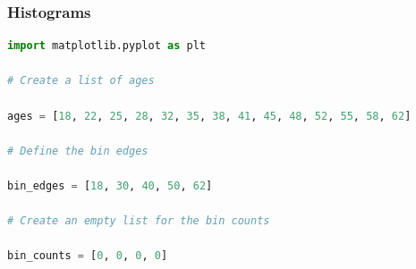 \documentclass{beamer}
\begin{document}
    \begin{frame}[fragile]
    \frametitle{Histograms}
    \begin{lstlisting}[language=Python]
import matplotlib.pyplot as plt

# Create a list of ages

ages = [18, 22, 25, 28, 32, 35, 38, 41, 45, 48, 52, 55, 58, 62]

# Define the bin edges

bin_edges = [18, 30, 40, 50, 62]

# Create an empty list for the bin counts

bin_counts = [0, 0, 0, 0]
    \end{lstlisting}
    \end{frame}
\end{document}
